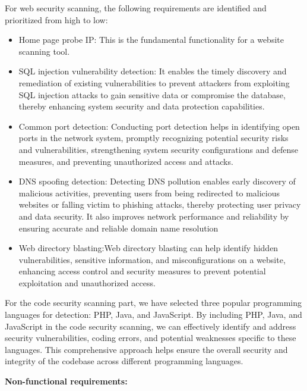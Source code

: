 \documentclass[journal]{IEEEtran}
\begin{document}
For web security scanning, the following requirements are identified and prioritized from high to low:
\begin{itemize}
  \item Home page probe IP: This is the fundamental functionality for a website scanning tool.
  \item SQL injection vulnerability detection: It enables the timely discovery and remediation of existing vulnerabilities to prevent attackers from exploiting SQL injection attacks to gain sensitive data or compromise the database, thereby enhancing system security and data protection capabilities.
  \item Common port detection: Conducting port detection helps in identifying open ports in the network system, promptly recognizing potential security risks and vulnerabilities, strengthening system security configurations and defense measures, and preventing unauthorized access and attacks.
  \item DNS spoofing detection: Detecting DNS pollution enables early discovery of malicious activities, preventing users from being redirected to malicious websites or falling victim to phishing attacks, thereby protecting user privacy and data security. It also improves network performance and reliability by ensuring accurate and reliable domain name resolution
  \item Web directory blasting:Web directory blasting can help identify hidden vulnerabilities, sensitive information, and misconfigurations on a website, enhancing access control and security measures to prevent potential exploitation and unauthorized access.
\end{itemize}
For the code security scanning part, we have selected three popular programming languages for detection: PHP, Java, and JavaScript.
By including PHP, Java, and JavaScript in the code security scanning, we can effectively identify and address security vulnerabilities, coding errors, and potential weaknesses specific to these languages. This comprehensive approach helps ensure the overall security and integrity of the codebase across different programming languages.

\textbf{Non-functional requirements:}
\end{document}
